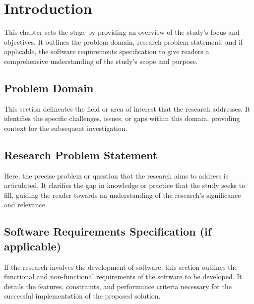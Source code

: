 \chapter{Introduction}
\label{sec:introduction}
This chapter sets the stage by providing an overview of the study's focus and objectives. It outlines the problem domain, research problem statement, and if applicable, the software requirements specification to give readers a comprehensive understanding of the study's scope and purpose.

\section{Problem Domain}
This section delineates the field or area of interest that the research addresses. It identifies the specific challenges, issues, or gaps within this domain, providing context for the subsequent investigation.

\section{Research Problem Statement}
Here, the precise problem or question that the research aims to address is articulated. It clarifies the gap in knowledge or practice that the study seeks to fill, guiding the reader towards an understanding of the research's significance and relevance.

\section{Software Requirements Specification (if applicable)}
If the research involves the development of software, this section outlines the functional and non-functional requirements of the software to be developed. It details the features, constraints, and performance criteria necessary for the successful implementation of the proposed solution.

